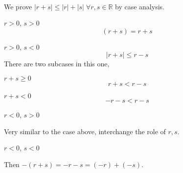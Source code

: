 \begin{pr}\leavevmode
    \\
    We prove $|r + s| \leq |r| + |s| \;\forall r,s \in \mathbb{R}$ by case analysis.
    \begin{casesp}
        \item $r > 0$, $s > 0$
        \begin{equation*}
            (r + s) = r + s
        \end{equation*}
        \item $r > 0$, $s < 0$
        \begin{equation*}
            |r + s| \leq r - s
        \end{equation*}
        There are two subcases in this one,
        \begin{casesp}
            \item $r + s \geq 0$
            \begin{equation*}
                r + s < r - s
            \end{equation*}
            \item $r + s < 0$
            \begin{equation*}
                -r - s < r - s
            \end{equation*}
        \end{casesp}
        \item $r < 0$, $s > 0$

        Very similar to the case above, interchange the role of $r, s$.
        
        \item $r < 0$, $s < 0$
        
        Then $-(r + s) = -r - s = (-r) + (-s)$.
    \end{casesp}
\end{pr}

